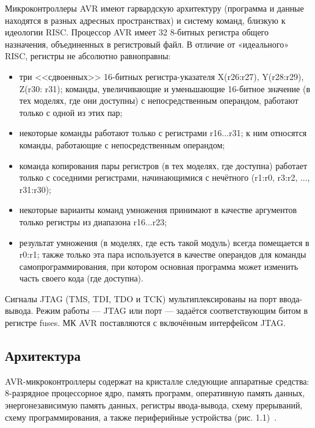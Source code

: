 \documentclass[12pt, oneside]{altsu-report}
\begin{document}
Микроконтроллеры AVR имеют гарвардскую архитектуру (программа и данные находятся в разных адресных пространствах) и систему команд, близкую к идеологии RISC. Процессор AVR имеет 32 8-битных регистра общего назначения, объединенных в регистровый файл. В отличие от «идеального» RISC, регистры не абсолютно равноправны:~\cite{wikiRUAVR}

\begin{itemize}
    \item три <<сдвоенных>> 16-битных регистра-указателя X(r26:r27), Y(r28:r29), Z(r30: r31); команды, увеличивающие и уменьшающие 16-битное значение (в тех моделях, где они доступны) с непосредственным операндом, работают только с одной из этих пар;

    \item некоторые команды работают только с регистрами r16...r31; к ним относятся команды, работающие с непосредственным операндом;

    \item команда копирования пары регистров (в тех моделях, где доступна) работает только с соседними регистрами, начинающимися с нечётного (r1:r0, r3:r2, ..., r31:r30);

    \item некоторые варианты команд умножения принимают в качестве аргументов только регистры из диапазона r16...r23;

    \item результат умножения (в моделях, где есть такой модуль) всегда помещается в r0:r1; также только эта пара используется в качестве операндов для команды самопрограммирования, при котором основная программа может изменить часть своего кода (где доступна).
\end{itemize}

Сигналы JTAG (TMS, TDI, TDO и TCK) мультиплексированы на порт ввода-вывода. Режим работы --- JTAG или порт --- задаётся соответствующим битом в регистре fuses. МК AVR поставляются с включённым интерфейсом JTAG.

\subsection{Архитектура}

AVR-микроконтроллеры содержат на кристалле следующие аппаратные средства: 8-разрядное процессорное ядро, память программ, оперативную память данных, энергонезависимую память данных, регистры ввода-вывода, схему прерываний, схему программирования, а также периферийные устройства (рис. 1.1)~\cite{arch_avr_2021}.
\end{document}
